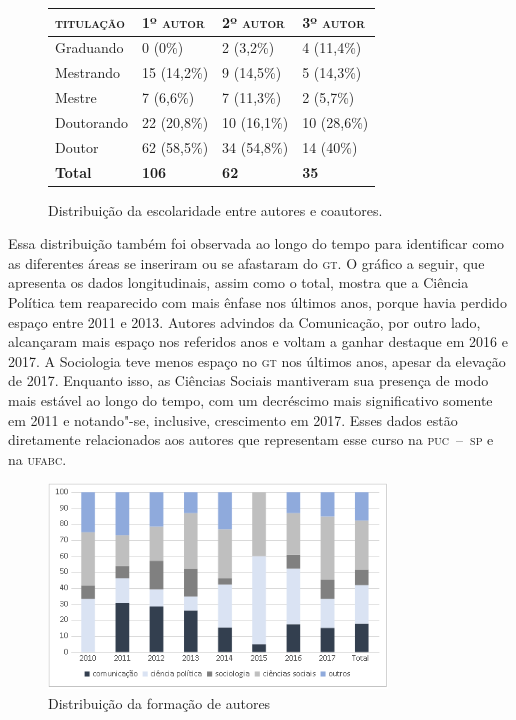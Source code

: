 \begin{figure}[!ht]
\begin{center}
\begin{tabular}{|l|l|l|l|}
\hline
\textsc{titulação} & \textsc{1º autor} & \textsc{2º autor} & \textsc{3º autor} \\ \hline\hline
Graduando          & 0 (0\%)           & 2 (3,2\%)         & 4 (11,4\%)        \\ \hline
Mestrando          & 15 (14,2\%)       & 9 (14,5\%)        & 5 (14,3\%)        \\ \hline
Mestre             & 7 (6,6\%)         & 7 (11,3\%)        & 2 (5,7\%)         \\ \hline
Doutorando         & 22 (20,8\%)       & 10 (16,1\%)       & 10 (28,6\%)       \\ \hline
Doutor             & 62 (58,5\%)       & 34 (54,8\%)       & 14 (40\%)         \\ \hline
\textbf{Total} 		& \textbf{106} 		& \textbf{62}  &	\textbf{35}		\\ \hline
\end{tabular}
\end{center}

\caption{Distribuição da escolaridade entre autores e coautores.\footnotemark}
\end{figure}


Essa distribuição também foi observada ao longo do tempo para
identificar como as diferentes áreas se inseriram ou se afastaram do \textsc{gt}.
O gráfico a seguir, que apresenta os dados longitudinais, assim como o
total, mostra que a Ciência Política tem reaparecido com mais ênfase nos
últimos anos, porque havia perdido espaço entre 2011 e 2013. Autores
advindos da Comunicação, por outro lado, alcançaram mais espaço nos
referidos anos e voltam a ganhar destaque em 2016 e 2017. A Sociologia
teve menos espaço no \textsc{gt} nos últimos anos, apesar da elevação de 2017.
Enquanto isso, as Ciências Sociais mantiveram sua presença de modo mais
estável ao longo do tempo, com um decréscimo mais significativo somente
em 2011 e notando"-se, inclusive, crescimento em 2017. Esses dados estão
diretamente relacionados aos autores que representam esse curso na
\textsc{puc~--~sp} e na \textsc{ufabc}.


\pagebreak
 \begin{figure}[!ht]
 \centering
  \includegraphics[width=90mm]{./imgs/graf3_4.png}
 \caption{Distribuição da formação de autores\footnotemark}
 \end{figure}

